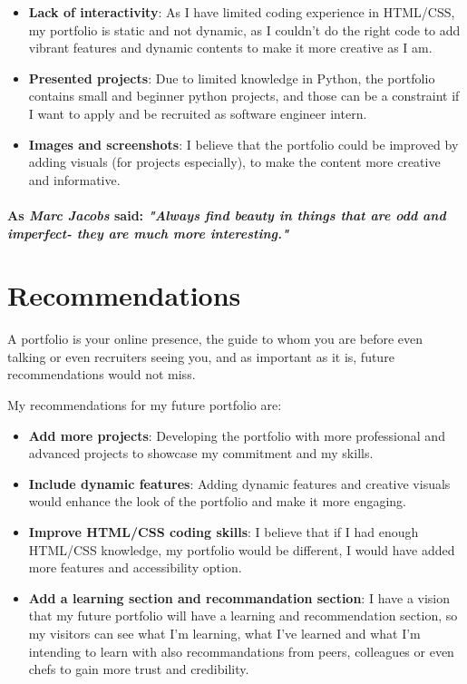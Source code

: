 \documentclass[12pt]{article}
\begin{document}
\begin{itemize}
\item{\textbf{Lack of interactivity}: As I have limited coding experience in HTML/CSS, my portfolio is static and not dynamic, as I couldn't do the right code to add vibrant features and dynamic contents to make it more creative as I am.}

\item{\textbf{Presented projects}: Due to limited knowledge in Python, the portfolio contains small and beginner python projects, and those can be a constraint if I want to apply and be recruited as software engineer intern.}

\item{\textbf{Images and screenshots}: I believe that the portfolio could be improved by adding visuals (for projects especially), to make the content more creative and informative.}

\end{itemize}

\paragraph{As \textit{Marc Jacobs} said:  \textit{ "Always find beauty in things that are odd and imperfect- they are much more interesting."}}




\newpage

\section{Recommendations }
A portfolio is your online presence, the guide to whom you are before even talking or even recruiters seeing you, and as important as it is, future recommendations would not miss.

My recommendations for my future portfolio are:

\begin{itemize}
 \item {\textbf{Add more projects}: Developing the portfolio with more professional and advanced projects to showcase my commitment and my skills.}

 \item {\textbf{Include dynamic features}: Adding dynamic features and creative visuals would enhance the look of the portfolio and make it more engaging. }

\item {\textbf{Improve HTML/CSS coding skills}: I believe that if I had enough HTML/CSS knowledge, my portfolio would be different, I would have added more features and accessibility option.}

\item {\textbf{Add a learning section and recommandation section}: I have a vision that my future portfolio will have a learning and recommendation section, so my visitors can see what I'm learning, what I've learned and what I'm intending to learn with also recommandations from peers, colleagues or even chefs to gain more trust and credibility.} 

\end{itemize}
\end{document}
